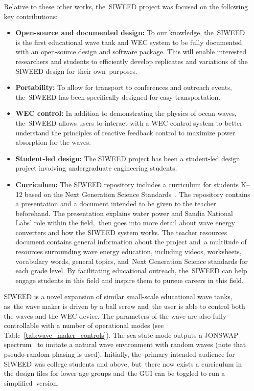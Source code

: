 \documentclass[hardware,article,submit,pdftex,moreauthors]{Definitions/mdpi}
\begin{document}
Relative to these other works, the~SIWEED project was focused on the following key contributions:

\begin{itemize}
  \item \textbf{Open-source and documented design:} %
 To our knowledge, the~SIWEED is the first educational wave tank and WEC system to be fully documented with an open-source design and software package.
  This will enable interested researchers and students to efficiently develop replicates and variations of the SIWEED design for their own~purposes.
  \item \textbf{Portability:} To allow for transport to conferences and outreach events, the~SIWEED has been specifically designed for easy transportation.
  \item \textbf{WEC control:} In addition to demonstrating the physics of ocean waves, the~SIWEED allows users to interact with a WEC control system to better understand the principles of reactive feedback control to maximize power absorption for the waves.
  \item \textbf{Student-led design:} The SIWEED project has been a student-led design project involving undergraduate engineering students.
  \item \textbf{Curriculum:} The SIWEED repository includes a curriculum for students K--12 based on the Next Generation Science Standards~\cite{NextGenScience2021}. 
  The repository contains a presentation and a document intended to be given to the teacher beforehand.
  The presentation explains water power and Sandia National Labs' role within the field,~then goes into more detail about wave energy converters and how the SIWEED system works.
  The teacher resources document contains general information about the project and~a multitude of resources surrounding wave energy education, including videos, worksheets, vocabulary words, general topics, and~Next Generation Science standards for each grade level.
  By facilitating educational outreach, the~SIWEED can help engage students in this field and inspire them to pursue careers in this field.
\end{itemize}

SIWEED is a novel expansion of similar small-scale educational wave tanks, as~the wave maker is driven by a ball screw and~the user is able to control both the waves and the WEC device.
The parameters of the wave are also fully controllable with a number of operational modes (see Table~\ref{tab:wave_maker_controls}).
The sea state mode outputs a JONSWAP spectrum~\cite{Hasselmann1973} to imitate a natural wave environment with random waves (note that pseudo-random phasing is used).
Initially, the~primary intended audience for SIWEED was college students and above, but~there now exists a curriculum in the design files for lower age groups and~the GUI can be toggled to run a simplified~version.
\end{document}
